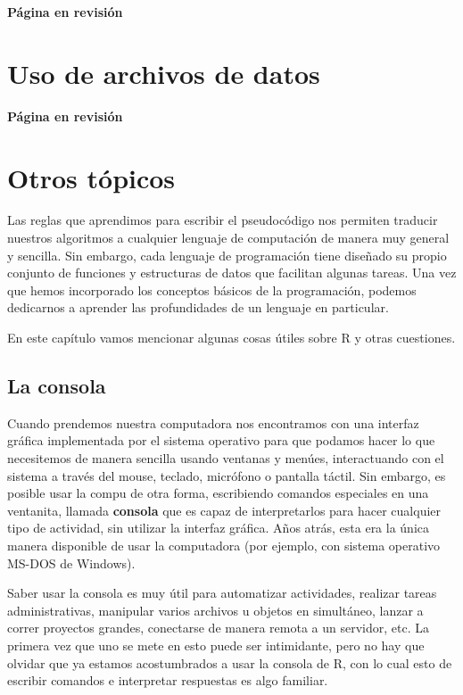 \documentclass[
]{book}
\begin{document}
\textbf{Página en revisión}

\hypertarget{uso-de-archivos-de-datos}{%
\chapter{Uso de archivos de datos}\label{uso-de-archivos-de-datos}}

\textbf{Página en revisión}

\hypertarget{otros-tuxf3picos}{%
\chapter{Otros tópicos}\label{otros-tuxf3picos}}

Las reglas que aprendimos para escribir el pseudocódigo nos permiten traducir nuestros algoritmos a cualquier lenguaje de computación de manera muy general y sencilla. Sin embargo, cada lenguaje de programación tiene diseñado su propio conjunto de funciones y estructuras de datos que facilitan algunas tareas. Una vez que hemos incorporado los conceptos básicos de la programación, podemos dedicarnos a aprender las profundidades de un lenguaje en particular.

En este capítulo vamos mencionar algunas cosas útiles sobre R y otras cuestiones.

\hypertarget{la-consola}{%
\section{La consola}\label{la-consola}}

Cuando prendemos nuestra computadora nos encontramos con una interfaz gráfica implementada por el sistema operativo para que podamos hacer lo que necesitemos de manera sencilla usando ventanas y menúes, interactuando con el sistema a través del mouse, teclado, micrófono o pantalla táctil. Sin embargo, es posible usar la compu de otra forma, escribiendo comandos especiales en una ventanita, llamada \textbf{consola} que es capaz de interpretarlos para hacer cualquier tipo de actividad, sin utilizar la interfaz gráfica. Años atrás, esta era la única manera disponible de usar la computadora (por ejemplo, con sistema operativo MS-DOS de Windows).

Saber usar la consola es muy útil para automatizar actividades, realizar tareas administrativas, manipular varios archivos u objetos en simultáneo, lanzar a correr proyectos grandes, conectarse de manera remota a un servidor, etc. La primera vez que uno se mete en esto puede ser intimidante, pero no hay que olvidar que ya estamos acostumbrados a usar la consola de R, con lo cual esto de escribir comandos e interpretar respuestas es algo familiar.
\end{document}
